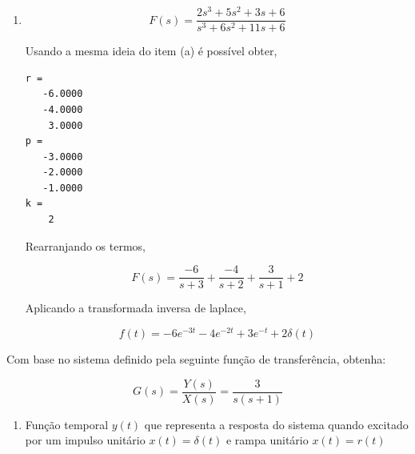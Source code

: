 \documentclass[paper=a4, fontsize=11pt]{article}
\begin{document}
\begin{list}{\textbf{Questão .}}{
\setlength{\labelwidth}{-2mm} \setlength{\parsep}{0mm}
\setlength{\topsep}{0mm} \setlength{\leftmargin}{0mm}}
\begin{enumerate}
        Usando a mesma ideia do item (a) é possível obter, 

        \begin{lstlisting}
r = 
   -0.5000 - 0.2887i
   -0.5000 + 0.2887i
    1.0000 + 0.0000i

p = 
   -0.5000 + 0.8660i
   -0.5000 - 0.8660i
    0.0000 + 0.0000i

k = 
    []
    \end{lstlisting}


    Rearranjando os termos, 

    $$
    F(s) = \frac{-0.5000-0.2887j}{s-(-0.5000+0.8660j)} + \frac{-0.5000+0.2887j}{s-(-0.5000-0.8660j)} + \frac{1}{s}
    $$

    Aplicando a transformada inversa de laplace,

    $$
    f(t) = (-0.5-0.2887j) e^{(-0.5+0.866j) t} + (-0.5+0.2887j) e^{(-0.5-0.866j) t} + 1
    $$

    \item

        $$
        F(s) = \frac{2 s^3 + 5 s^2 + 3 s + 6}{s^3 + 6 s^2 + 11 s + 6}
        $$

        Usando a mesma ideia do item (a) é possível obter, 

        \begin{lstlisting}
r = 
   -6.0000
   -4.0000
    3.0000
p = 
   -3.0000
   -2.0000
   -1.0000
k = 
    2
    \end{lstlisting}


        Rearranjando os termos, 

        $$
        F(s) = \frac{-6}{s+3} + \frac{-4}{s+2} + \frac{3}{s+1} + 2
        $$

        Aplicando a transformada inversa de laplace,

        $$
        f(t) = -6 e^{-3t} -4 e^{-2t} + 3 e^{-t} + 2 \delta(t)
        $$

    \end{enumerate}






\newpage


\item 
    Com base no sistema definido pela seguinte função de transferência, obtenha:

    $$
    G(s) = \frac{Y(s)}{X(s)} = \frac{3}{s(s+1)}
    $$
    \begin{enumerate}
        \item
            Função temporal $y(t)$ que representa a resposta do sistema quando excitado
            por um impulso unitário $x(t)=\delta(t)$ e rampa unitário $x(t)=r(t)$ \\


\end{enumerate}
\end{list}
\end{document}
